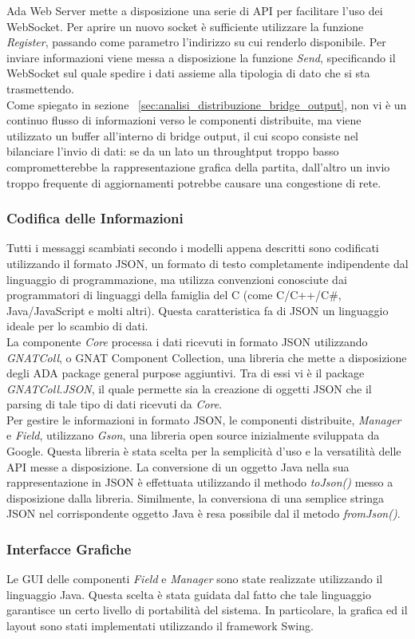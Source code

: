 Ada Web Server mette a disposizione una serie di API per facilitare l'uso dei WebSocket. Per aprire un nuovo socket è sufficiente utilizzare la funzione \emph{Register}, passando come parametro l'indirizzo su cui renderlo disponibile. Per inviare informazioni viene messa a disposizione la funzione \emph{Send}, specificando il WebSocket sul quale spedire i dati assieme alla tipologia di dato che si sta trasmettendo.\\

Come spiegato in sezione ~\ref{sec:analisi_distribuzione_bridge_output}, non vi è un continuo flusso di informazioni verso le componenti distribuite, ma viene utilizzato un buffer all'interno di bridge output, il cui scopo consiste nel bilanciare l'invio di dati: se da un lato un throughtput troppo basso comprometterebbe la rappresentazione grafica della partita, dall'altro un invio troppo frequente di aggiornamenti potrebbe causare una congestione di rete.

\subsubsection{Codifica delle Informazioni}

Tutti i messaggi scambiati secondo i modelli appena descritti sono codificati utilizzando il formato JSON, un formato di testo completamente indipendente dal linguaggio di programmazione, ma utilizza convenzioni conosciute dai programmatori di linguaggi della famiglia del C (come C/C++/C\#, Java/JavaScript e molti altri). Questa caratteristica fa di JSON un linguaggio ideale per lo scambio di dati.\\

La componente \emph{Core} processa i dati ricevuti in formato JSON utilizzando \emph{GNATColl}, o GNAT Component Collection, una libreria che mette a disposizione degli ADA package general purpose aggiuntivi. Tra di essi vi è il package \emph{GNATColl.JSON}, il quale permette sia la creazione di oggetti JSON che il parsing di tale tipo di dati ricevuti da \emph{Core}.\\

Per gestire le informazioni in formato JSON, le componenti distribuite, \emph{Manager} e \emph{Field}, utilizzano \emph{Gson}, una libreria open source  inizialmente sviluppata da Google. Questa libreria è stata scelta per la semplicità d'uso e la versatilità delle API messe a disposizione. La conversione di un oggetto Java nella sua rappresentazione in JSON è effettuata utilizzando il methodo \emph{toJson()} messo a disposizione dalla libreria. Similmente, la conversiona di una semplice stringa JSON nel corrispondente oggetto Java è resa possibile dal il metodo \emph{fromJson()}.

\subsubsection{Interfacce Grafiche}
Le GUI delle componenti \emph{Field} e \emph{Manager} sono state realizzate utilizzando il linguaggio Java. Questa scelta \`{e} stata guidata dal fatto che tale linguaggio garantisce un certo livello di portabilit\`{a} del sistema. In particolare, la grafica ed il layout sono stati implementati utilizzando il framework Swing.
